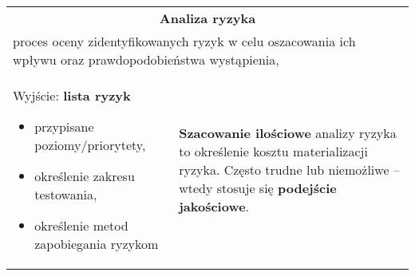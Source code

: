\documentclass[../main.tex]{subfiles}
\begin{document}
    \begin{table}[H]
        \begin{center}
            \begin{tabular}{| p{8cm}  p{8cm} |}
                \hline
                \multicolumn{2}{|c|}{\textbf{Analiza ryzyka}} \\
                \multicolumn{2}{|p{16,5cm}|}{proces oceny zidentyfikowanych ryzyk w celu oszacowania ich wpływu
                oraz prawdopodobieństwa wystąpienia,} \\
                \hline
                Wyjście: \textbf{lista ryzyk}
                \begin{itemize}
                    \item przypisane poziomy/priorytety,
                    \item określenie zakresu testowania,
                    \item określenie metod zapobiegania ryzykom
                \end{itemize}
                &
                \textbf{Szacowanie ilościowe} analizy ryzyka to określenie kosztu materializacji ryzyka.
                Często trudne lub niemożliwe – wtedy stosuje się \textbf{podejście jakościowe}. \\



\end{tabular}
\end{center}
\end{table}
\end{document}
